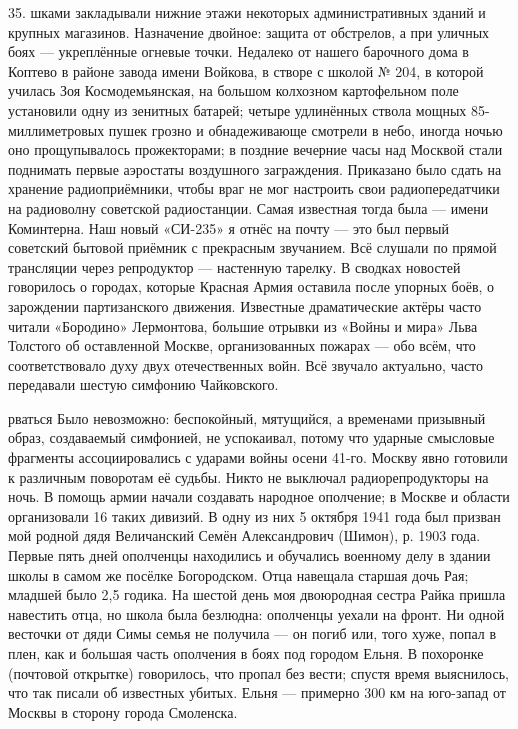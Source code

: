 \label{35-1}
35. шками закладывали нижние этажи некоторых административных зданий и крупных магазинов. Назначение двойное: защита от обстрелов, а при уличных боях — укреплённые огневые точки. Недалеко от нашего барочного дома в Коптево в районе завода имени Войкова, в створе с школой № 204, в которой училась Зоя Космодемьянская, на большом колхозном картофельном поле установили одну из зенитных батарей; четыре удлинённых ствола мощных 85-миллиметровых пушек грозно и обнадеживающе смотрели в небо, иногда ночью оно прощупывалось прожекторами; в поздние вечерние часы над Москвой стали поднимать первые аэростаты воздушного заграждения. Приказано было сдать на хранение радиоприёмники, чтобы враг не мог настроить свои радиопередатчики на радиоволну советской радиостанции. Самая известная тогда была — имени Коминтерна. Наш новый «СИ-235» я отнёс на почту — это был первый советский бытовой приёмник с прекрасным звучанием. Всё слушали по прямой трансляции через репродуктор — настенную тарелку. В сводках новостей говорилось о городах, которые Красная Армия оставила после упорных боёв, о зарождении партизанского движения. Известные драматические актёры часто читали «Бородино» Лермонтова, большие отрывки из «Войны и мира» Льва Толстого об оставленной Москве, организованных пожарах — обо всём, что соответствовало духу двух отечественных войн. Всё звучало актуально, часто передавали шестую симфонию Чайковского.

\label{36-1}
рваться Было невозможно: беспокойный, мятущийся, а временами призывный образ, создаваемый симфонией, не успокаивал, потому что ударные смысловые фрагменты ассоциировались с ударами войны осени 41-го. Москву явно готовили к различным поворотам её судьбы. Никто не выключал радиорепродукторы на ночь. В помощь армии начали создавать народное ополчение; в Москве и области организовали 16 таких дивизий. В одну из них 5 октября 1941 года был призван мой родной дядя Величанский Семён Александрович (Шимон), р. 1903 года. Первые пять дней ополченцы находились и обучались военному делу в здании школы в самом же посёлке Богородском. Отца навещала старшая дочь Рая; младшей было 2,5 годика. На шестой день моя двоюродная сестра Райка пришла навестить отца, но школа была безлюдна: ополченцы уехали на фронт. Ни одной весточки от дяди Симы семья не получила — он погиб или, того хуже, попал в плен, как и большая часть ополчения в боях под городом Ельня. В похоронке (почтовой открытке) говорилось, что пропал без вести; спустя время выяснилось, что так писали об известных убитых. Ельня — примерно 300 км на юго-запад от Москвы в сторону города Смоленска.

